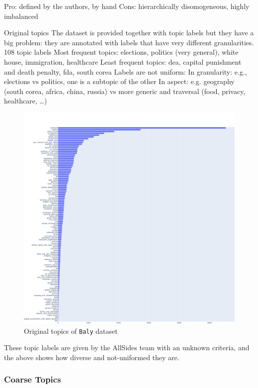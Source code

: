 Pro: defined by the authors, by hand
Cons: hierarchically disomogeneous, highly imbalanced

Original topics
The dataset is provided together with topic labels but they have a big problem: they are annotated with labels that have very different granularities.
108 topic labels
Most frequent topics: elections, politics (very general), white house, immigration, healthcare
Least frequent topics: dea, capital punishment and death penalty, fda, south corea
Labels are not uniform:
In granularity: e.g., elections vs politics, one is a subtopic of the other
In aspect: e.g. geography (south corea, africa, china, russia) vs more generic and traversal (food, privacy, healthcare, …)

\begin{figure}[!htbp]
    \centering
    \includegraphics[width=\linewidth]{figures/baly_original_topics.pdf}
    \caption{Original topics of \texttt{Baly} dataset}
    \label{fig:baly_original_topics}
\end{figure}

These topic labels are given by the AllSides team with an unknown criteria, and the above shows how diverse and not-uniformed they are.


\subsubsection{Coarse Topics}

